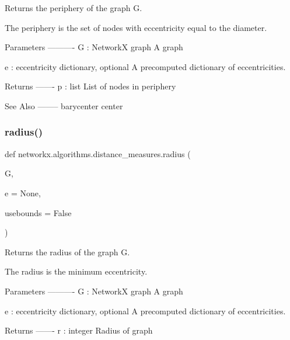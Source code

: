 \begin{DoxyVerb}Returns the periphery of the graph G.

The periphery is the set of nodes with eccentricity equal to the diameter.

Parameters
----------
G : NetworkX graph
   A graph

e : eccentricity dictionary, optional
  A precomputed dictionary of eccentricities.

Returns
-------
p : list
   List of nodes in periphery

See Also
--------
barycenter
center
\end{DoxyVerb}
 \mbox{\label{namespacenetworkx_1_1algorithms_1_1distance__measures_a2bcc1cd0cceac3e3440218a488d28773}} 
\subsubsection{\texorpdfstring{radius()}{radius()}}
{\footnotesize\ttfamily def networkx.\+algorithms.\+distance\+\_\+measures.\+radius (\begin{DoxyParamCaption}\item[{}]{G,  }\item[{}]{e = {\ttfamily None},  }\item[{}]{usebounds = {\ttfamily False} }\end{DoxyParamCaption})}

\begin{DoxyVerb}Returns the radius of the graph G.

The radius is the minimum eccentricity.

Parameters
----------
G : NetworkX graph
   A graph

e : eccentricity dictionary, optional
  A precomputed dictionary of eccentricities.

Returns
-------
r : integer
   Radius of graph
\end{DoxyVerb}
 \mbox{\label{namespacenetworkx_1_1algorithms_1_1distance__measures_a70a703783d4b11fc37ebf082199cb321}} 
